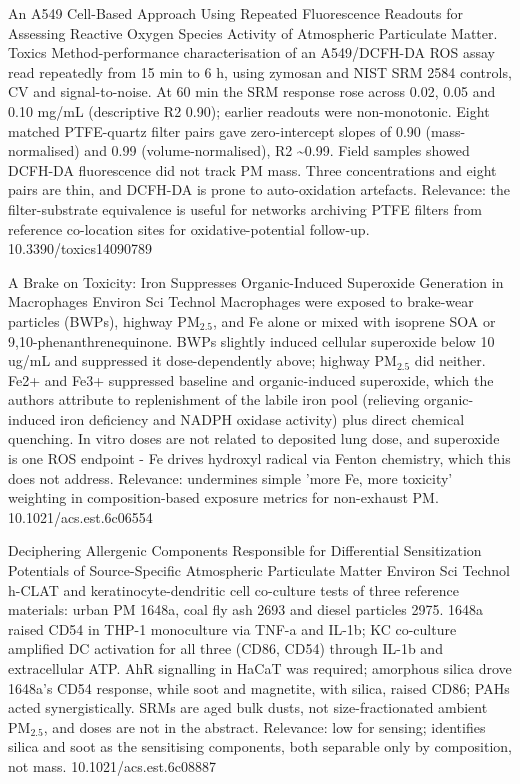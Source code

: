 \documentclass[10pt]{article}
\begin{document}
\par{}\baselineskip{}\baselineskip
{}

{An A549 Cell-Based Approach Using Repeated Fluorescence Readouts for Assessing Reactive Oxygen Species Activity of Atmospheric Particulate Matter.}
{Toxics}
{Method-performance characterisation of an A549/DCFH-DA ROS assay read repeatedly from 15 min to 6 h, using zymosan and NIST SRM 2584 controls, CV and signal-to-noise. At 60 min the SRM response rose across 0.02, 0.05 and 0.10 mg/mL (descriptive R2 0.90); earlier readouts were non-monotonic. Eight matched PTFE-quartz filter pairs gave zero-intercept slopes of 0.90 (mass-normalised) and 0.99 (volume-normalised), R2 \textasciitilde{}0.99. Field samples showed DCFH-DA fluorescence did not track PM mass. Three concentrations and eight pairs are thin, and DCFH-DA is prone to auto-oxidation artefacts. Relevance: the filter-substrate equivalence is useful for networks archiving PTFE filters from reference co-location sites for oxidative-potential follow-up.}
{10.3390/toxics14090789}

{A Brake on Toxicity: Iron Suppresses Organic-Induced Superoxide Generation in Macrophages}
{Environ Sci Technol}
{Macrophages were exposed to brake-wear particles (BWPs), highway PM$_{2.5}$, and Fe alone or mixed with isoprene SOA or 9,10-phenanthrenequinone. BWPs slightly induced cellular superoxide below 10 ug/mL and suppressed it dose-dependently above; highway PM$_{2.5}$ did neither. Fe2+ and Fe3+ suppressed baseline and organic-induced superoxide, which the authors attribute to replenishment of the labile iron pool (relieving organic-induced iron deficiency and NADPH oxidase activity) plus direct chemical quenching. In vitro doses are not related to deposited lung dose, and superoxide is one ROS endpoint - Fe drives hydroxyl radical via Fenton chemistry, which this does not address. Relevance: undermines simple 'more Fe, more toxicity' weighting in composition-based exposure metrics for non-exhaust PM.}
{10.1021/acs.est.6c06554}

{Deciphering Allergenic Components Responsible for Differential Sensitization Potentials of Source-Specific Atmospheric Particulate Matter}
{Environ Sci Technol}
{h-CLAT and keratinocyte-dendritic cell co-culture tests of three reference materials: urban PM 1648a, coal fly ash 2693 and diesel particles 2975. 1648a raised CD54 in THP-1 monoculture via TNF-a and IL-1b; KC co-culture amplified DC activation for all three (CD86, CD54) through IL-1b and extracellular ATP. AhR signalling in HaCaT was required; amorphous silica drove 1648a's CD54 response, while soot and magnetite, with silica, raised CD86; PAHs acted synergistically. SRMs are aged bulk dusts, not size-fractionated ambient PM$_{2.5}$, and doses are not in the abstract. Relevance: low for sensing; identifies silica and soot as the sensitising components, both separable only by composition, not mass.}
{10.1021/acs.est.6c08887}
\end{document}
